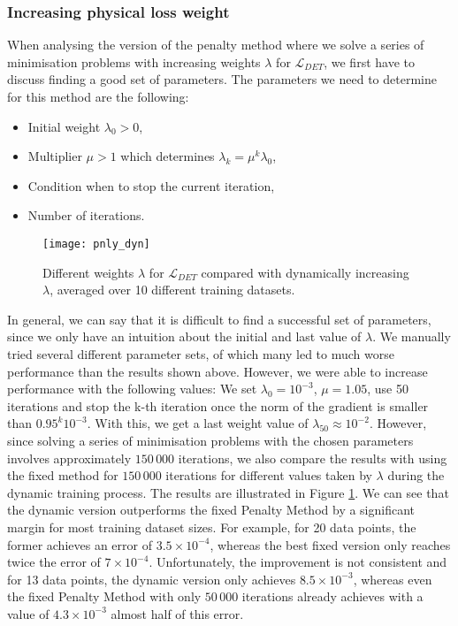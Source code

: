 \subsubsection{Increasing physical loss weight}
When analysing the version of the penalty method where we solve a series of minimisation problems with increasing weights $\lambda$ for $\mathcal{L}_{DET}$, we first have to discuss finding a good set of parameters. The parameters we need to determine for this method are the following:
\begin{itemize}
	\item Initial weight $\lambda_0 > 0$,
	\item Multiplier $\mu > 1$ which determines $\lambda_k = \mu^k\lambda_0$,
	\item Condition when to stop the current iteration,
	\item Number of iterations.
\end{itemize}
\begin{figure}[H]
	\centering
	\texttt{[image: pnly\_dyn]}
	\caption{Different weights $\lambda$ for $\mathcal{L}_{DET}$ compared with dynamically increasing $\lambda$, averaged over 10 different training datasets.}
	\label{fig:pnly_dyn}
\end{figure}
In general, we can say that it is difficult to find a successful set of parameters, since we only have an intuition about the initial and last value of $\lambda$. We manually tried several different parameter sets, of which many led to much worse performance than the results shown above. However, we were able to increase performance with the following values: We set $\lambda_0 = 10^{-3}$, $\mu = 1.05$, use 50 iterations and stop the k-th iteration once the norm of the gradient is smaller than $0.95^{k} 10^{-3}$. With this, we get a last weight value of $\lambda_{50} \approx 10^{-2}$. However, since solving a series of minimisation problems with the chosen parameters involves approximately $150\,000$ iterations, we also compare the results with using the fixed method for $150\,000$ iterations for different values taken by $\lambda$ during the dynamic training process. The results are illustrated in Figure \ref{fig:pnly_dyn}. We can see that the dynamic version outperforms the fixed Penalty Method by a significant margin for most training dataset sizes. For example, for 20 data points, the former achieves an error of $3.5\times 10^{-4}$, whereas the best fixed version only reaches twice the error of $7\times 10^{-4}$. Unfortunately, the improvement is not consistent and for 13 data points, the dynamic version only achieves $8.5 \times 10^{-3}$, whereas even the fixed Penalty Method with only $50\,000$ iterations already achieves with a value of $4.3 \times 10^{-3}$ almost half of this error.

